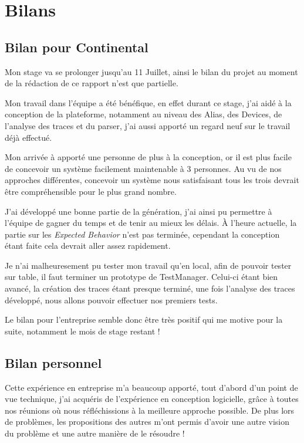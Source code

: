 \chapter{Bilans}
	\section{Bilan pour Continental}
	Mon stage va se prolonger jusqu'au 11 Juillet, ainsi le bilan du projet au moment de la rédaction de ce rapport n'est que partielle. 

	Mon travail dans l'équipe a été bénéfique, en effet durant ce stage, j'ai aidé à la conception de la plateforme, notamment au niveau des Alias, des Devices, de l'analyse des traces et du parser, 	j'ai aussi apporté un regard neuf sur le travail déjà effectué.

	Mon arrivée à apporté une personne de plus à la conception, or il est plus facile de concevoir un système facilement maintenable à 3 personnes. Au vu de nos
	approches différentes, concevoir un système nous satisfaisant tous les trois devrait être compréhensible pour le plus grand nombre.
	
	J'ai développé une bonne partie de la génération, j'ai ainsi pu permettre à l'équipe de gagner du temps et de
	tenir au mieux les délais. À l'heure actuelle, la partie sur les \textit{Expected Behavior} n'est pas terminée, cependant la conception étant faite cela devrait aller
	assez rapidement.
	
	Je n'ai malheuresement pu tester mon travail qu'en local, afin de pouvoir tester sur table, il faut terminer un prototype de TestManager. Celui-ci étant bien
	avancé, la création des traces étant presque terminé, une fois l'analyse des traces développé, nous allons pouvoir effectuer nos premiers tests.

	Le bilan pour l'entreprise semble donc être très positif qui me motive pour la suite, notamment le mois de stage restant !

	\section{Bilan personnel}
	Cette expérience en entreprise m'a beaucoup apporté, tout d'abord d'un point de vue technique, j'ai acquéris de l'expérience en conception logicielle, grâce
	à toutes nos réunions où nous réfléchissions à la meilleure approche possible. De plus lors de problèmes, les propositions des autres m'ont permis d'avoir
	une autre vision du problème et une autre manière de le résoudre !

